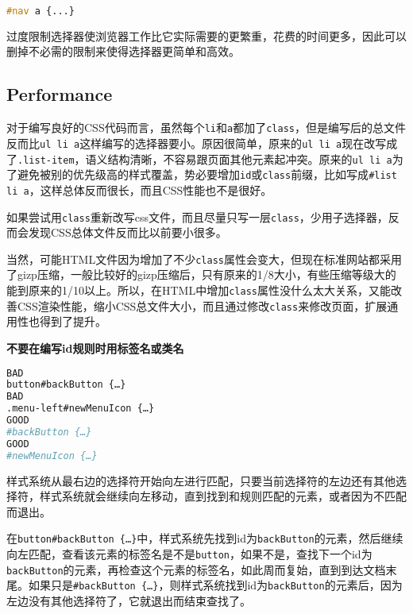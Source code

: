 \begin{lstlisting}[language=CSS]
#nav a {...}
\end{lstlisting}

过度限制选择器使浏览器工作比它实际需要的更繁重，花费的时间更多，因此可以删掉不必需的限制来使得选择器更简单和高效。

\clearpage

\subsection{Performance}

对于编写良好的CSS代码而言，虽然每个\texttt{li}和\texttt{a}都加了\texttt{class}，但是编写后的总文件反而比\texttt{ul li a}这样编写的选择器要小。原因很简单，原来的\texttt{ul li a}现在改写成了\texttt{.list-item}，语义结构清晰，不容易跟页面其他元素起冲突。原来的\texttt{ul li a}为了避免被别的优先级高的样式覆盖，势必要增加\texttt{id}或\texttt{class}前缀，比如写成\texttt{\#list li a}，这样总体反而很长，而且CSS性能也不是很好。

如果尝试用\texttt{class}重新改写css文件，而且尽量只写一层\texttt{class}，少用子选择器，反而会发现CSS总体文件反而比以前要小很多。

当然，可能HTML文件因为增加了不少\texttt{class}属性会变大，但现在标准网站都采用了gizp压缩，一般比较好的gizp压缩后，只有原来的1/8大小，有些压缩等级大的能到原来的1/10以上。所以，在HTML中增加\texttt{class}属性没什么太大关系，又能改善CSS渲染性能，缩小CSS总文件大小，而且通过修改\texttt{class}来修改页面，扩展通用性也得到了提升。


\begin{compactenum}[1.]
\item \textbf{不要在编写id规则时用标签名或类名}
\end{compactenum}

\begin{lstlisting}[language=bash]
BAD
button#backButton {…}
BAD
.menu-left#newMenuIcon {…}
GOOD
#backButton {…}
GOOD
#newMenuIcon {…}
\end{lstlisting}

样式系统从最右边的选择符开始向左进行匹配，只要当前选择符的左边还有其他选择符，样式系统就会继续向左移动，直到找到和规则匹配的元素，或者因为不匹配而退出。

在\texttt{button\#backButton \{…\}}中，样式系统先找到id为\texttt{backButton}的元素，然后继续向左匹配，查看该元素的标签名是不是\texttt{button}，如果不是，查找下一个id为\texttt{backButton}的元素，再检查这个元素的标签名，如此周而复始，直到到达文档末尾。如果只是\texttt{\#backButton \{…\}}，则样式系统找到id为\texttt{backButton}的元素后，因为左边没有其他选择符了，它就退出而结束查找了。


